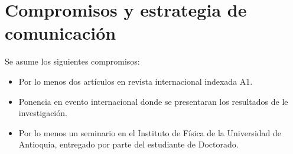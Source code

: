 \section{ Compromisos y estrategia de comunicación }


Se asume los siguientes compromisos:

\begin{itemize}

\item Por lo menos dos artículos en revista internacional indexada
  A1.

\item Ponencia en evento internacional donde se presentaran los resultados de le
  investigación.

\item
Por lo menos un seminario en el Instituto de Física de la Universidad
de Antioquia, entregado por parte del estudiante de Doctorado.

\end{itemize}



